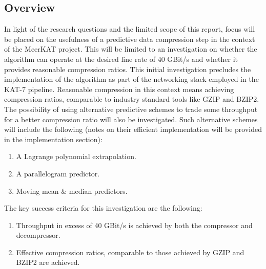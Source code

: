 \subsection{Overview}
In light of the research questions and the limited scope of this report, focus will be placed on the usefulness of a predictive data compression 
step in the context of the MeerKAT project. This will be limited to an investigation on whether the algorithm can operate at the desired line rate of
40 GBit/s and whether it provides reasonable compression ratios. This initial investigation precludes the implementation of the algorithm as part of 
the networking stack employed in the KAT-7 pipeline. Reasonable compression in this context means achieving compression ratios, comparable to industry standard 
tools like GZIP and BZIP2. The possibility of using alternative predictive schemes to trade some throughput for a better compression ratio will also be investigated.
Such alternative schemes will include the following (notes on their efficient implementation will be provided in the implementation section):
\begin{enumerate}
 \item A Lagrange polynomial extrapolation.
 \item A parallelogram predictor.
 \item Moving mean \& median predictors.
\end{enumerate}
The key success criteria for this investigation are the following:
\begin{enumerate}
 \item Throughput in excess of 40 GBit/s is achieved by both the compressor and decompressor.
 \item Effective compression ratios, comparable to those achieved by GZIP and BZIP2 are achieved.
\end{enumerate}
